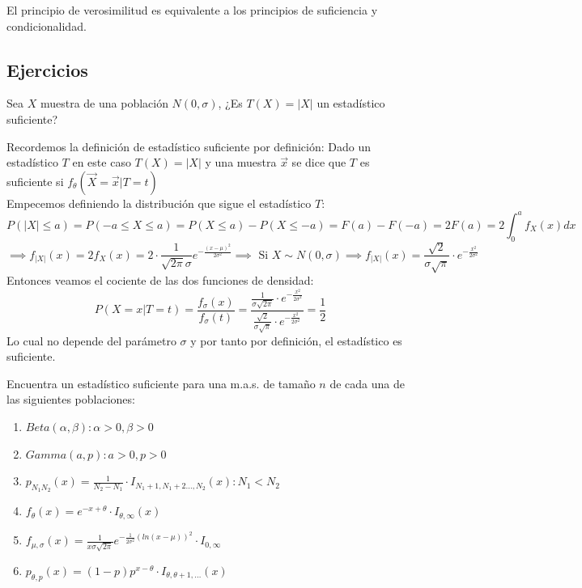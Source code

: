 \begin{teorema}
	El principio de verosimilitud es equivalente a los principios de suficiencia y condicionalidad.
\end{teorema}  

\subsection{Ejercicios}
\begin{problem}{2.1}
	Sea $X$ muestra de una población $N(0, \sigma)$, ¿Es $T(X) = |X|$ un estadístico suficiente?
\end{problem}
\begin{sol}
	Recordemos la definición de estadístico suficiente por definición: Dado un estadístico $T$ en este caso $T(X) = |X|$ y una muestra $\vec{x}$ se dice que $T$ es suficiente si $f_{\theta}(\vec{X} = \vec{x} | T = t)$ \\
	Empecemos definiendo la distribución que sigue el estadístico $T$: 
	$$P(|X| \leq a) = P(-a \leq X \leq a) = P(X \leq a) - P(X \leq -a) = F(a) - F(-a) = 2F(a) = 2\int_{0}^{a}f_{X}(x)dx$$
	$$\implies f_{|X|}(x) = 2f_{X}(x) = 2\cdot \frac{1}{\sqrt{2\pi}\sigma}e^{-\frac{(x - \mu)^2}{2\sigma^2}} \implies \text{ Si } X \sim N(0, \sigma) \implies f_{|X|}(x) = \frac{\sqrt{2}}{\sigma\sqrt{\pi}}\cdot e^{-\frac{x^2}{2\sigma^2}}$$
	Entonces veamos el cociente de las dos funciones de densidad:
	$$P(X = x | T = t) = \frac{f_{\sigma}(x)}{f_{\sigma}(t)} = \frac{\frac{1}{\sigma\sqrt{2\pi}}\cdot e^{-\frac{x^2}{2\sigma^2}}}{\frac{\sqrt{2}}{\sigma\sqrt{\pi}} \cdot e^{-\frac{x^2}{2\sigma^2}}} = \frac{1}{2}$$
	Lo cual no depende del parámetro $\sigma$ y por tanto por definición, el estadístico es suficiente. 
\end{sol}

\begin{problem}{2.2}
	Encuentra un estadístico suficiente para una m.a.s. de tamaño $n$ de cada una de las siguientes poblaciones: 
	\begin{enumerate}
		\item $Beta(\alpha, \beta) : \alpha > 0, \beta > 0$
		\item $Gamma(a, p) : a > 0, p > 0$
		\item $p_{N_1 N_2}(x) = \frac{1}{N_2 - N_1} \cdot I_{N_1 + 1, N_1 +2 \ldots, N_2}(x) : N_1 < N_2$
		\item $f_{\theta}(x) = e^{-x + \theta}\cdot I_{\theta, \infty}(x)$
		\item $f_{\mu, \sigma}(x) = \frac{1}{x\sigma\sqrt{2\pi}}e^{-\frac{1}{2\sigma^2}(ln(x - \mu))^2}\cdot I_{0, \infty}$
		\item $p_{\theta, p}(x) = (1 - p)p^{x - \theta} \cdot I_{\theta, \theta + 1, \ldots }(x)$
	\end{enumerate}
\end{problem}
\begin{sol}
	
\end{sol}